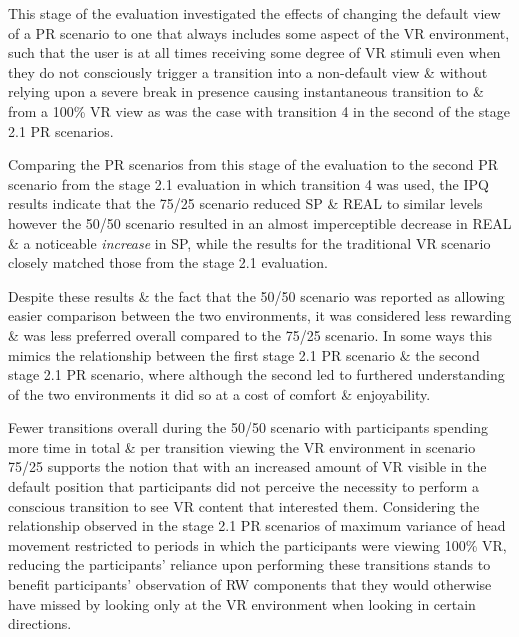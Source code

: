 This stage of the evaluation investigated the effects of changing the default view of a PR scenario to one that always includes some aspect of the VR environment, such that the user is at all times receiving some degree of VR stimuli even when they do not consciously trigger a transition into a non-default view \& without relying upon a severe break in presence causing instantaneous transition to \& from a 100\% VR view as was the case with transition 4 in the second of the stage 2.1 PR scenarios.

Comparing the PR scenarios from this stage of the evaluation to the second PR scenario from the stage 2.1 evaluation in which transition 4 was used, the IPQ results indicate that the 75/25 scenario reduced SP \& REAL to similar levels however the 50/50 scenario resulted in an almost imperceptible decrease in REAL \& a noticeable \textit{increase} in SP, while the results for the traditional VR scenario closely matched those from the stage 2.1 evaluation.

Despite these results \& the fact that the 50/50 scenario was reported as allowing easier comparison between the two environments, it was considered less rewarding \& was less preferred overall compared to the 75/25 scenario. In some ways this mimics the relationship between the first stage 2.1 PR scenario \& the second stage 2.1 PR scenario, where although the second led to furthered understanding of the two environments it did so at a cost of comfort \& enjoyability.

Fewer transitions overall during the 50/50 scenario with participants spending more time in total \& per transition viewing the VR environment in scenario 75/25 supports the notion that with an increased amount of VR visible in the default position that participants did not perceive the necessity to perform a conscious transition to see VR content that interested them. Considering the relationship observed in the stage 2.1 PR scenarios of maximum variance of head movement restricted to periods in which the participants were viewing 100\% VR, reducing the participants' reliance upon performing these transitions stands to benefit participants' observation of RW components that they would otherwise have missed by looking only at the VR environment when looking in certain directions.


